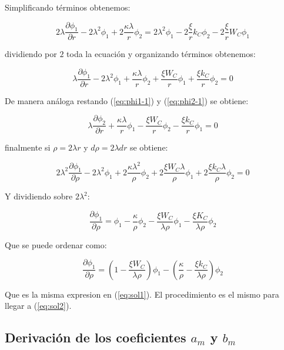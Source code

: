 \documentclass[a4paper, 12pt]{article} %
\begin{document}
Simplificando t\'erminos obtenemos:

\[
 2 \lambda \dfrac{\partial \phi_1}{\partial r} -  2 \lambda^2  \phi_1 + 2\dfrac{\kappa \lambda}{r}\phi_2
= 2\lambda^2 \phi_1 - 2 \dfrac{\xi}{r}k_C \phi_2 - 2\dfrac{\xi}{r}W_C \phi_1
\]

dividiendo por $2$ toda la ecuaci\'on y organizando t\'erminos obtenemos:

\begin{equation}
\lambda \dfrac{\partial \phi_1}{\partial r} - 2 \lambda^2 \phi_1 + \dfrac{\kappa \lambda}{r} \phi_2  + \dfrac{\xi W_C}{r} \phi_1 
+ \dfrac{\xi k_C}{r}\phi_2 = 0
\end{equation}

De manera an\'aloga restando (\ref{eq:phi1-1}) y  (\ref{eq:phi2-1}) se obtiene:

\begin{equation}
\lambda \dfrac{\partial \phi_2}{\partial r}  + \dfrac{\kappa \lambda}{r} \phi_1  - \dfrac{\xi W_C}{r} \phi_2 - \dfrac{\xi k_C}{r} \phi_1 = 0
\end{equation}

finalmente si $\rho = 2\lambda r$ y $d\rho = 2 \lambda dr$ se obtiene:

\[
2\lambda^2 \dfrac{\partial \phi_1}{\partial \rho} - 2\lambda^2 \phi_1 + 2 \dfrac{\kappa \lambda^2 }{\rho} \phi_2 
+ 2 \dfrac{\xi W_C \lambda}{\rho}\phi_1 + 2\dfrac{\xi k_C \lambda }{\rho}\phi_2 = 0
\]

Y dividiendo sobre $2\lambda^2$:

\[
\dfrac{\partial \phi_1}{\partial \rho} = \phi_1 - \dfrac{\kappa}{\rho}\phi_2 - \dfrac{\xi W_C}{\lambda \rho }\phi_1 - \dfrac{\xi K_C}{\lambda \rho}
\phi_2 
\]

Que se puede ordenar como:

\begin{equation}
\dfrac{\partial \phi_1}{\partial \rho} = \left( 1 - \dfrac{\xi W_C}{\lambda \rho} \right) \phi_1 
- \left( \dfrac{\kappa}{\rho} - \dfrac{\xi k_C}{\lambda \rho} \right) \phi_2
\end{equation}

Que es la misma expresion en (\ref{eq:sol1}). El procedimiento es el mismo para llegar a (\ref{eq:sol2}).

\subsection{Derivaci\'on de los coeficientes $a_m$ y $b_m$}
\end{document}
